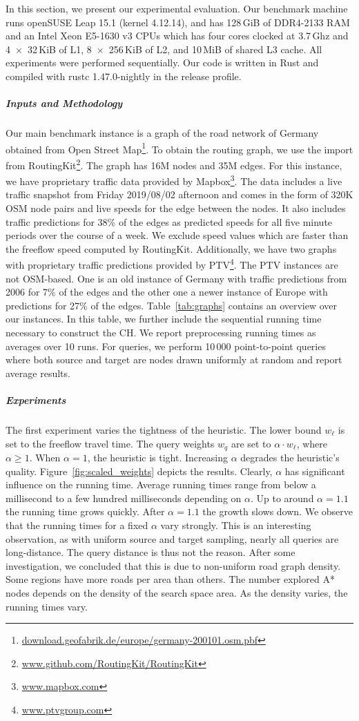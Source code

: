 \documentclass[a4paper,USenglish,cleveref, autoref, thm-restate]{lipics-v2019}
\begin{document}
In this section, we present our experimental evaluation.
Our benchmark machine runs openSUSE Leap 15.1 (kernel 4.12.14), and has 128\,GiB of DDR4-2133 RAM and an Intel Xeon E5-1630 v3 CPUs which has four cores clocked at 3.7\,Ghz and 4~$\times$~32\,KiB of L1, 8~$\times$~256\,KiB of L2, and 10\,MiB of shared L3 cache.
All experiments were performed sequentially.
Our code is written in Rust and compiled with rustc 1.47.0-nightly in the release profile. %

\subparagraph{Inputs and Methodology}
Our main benchmark instance is a graph of the road network of Germany obtained from Open Street Map\footnote{\url{download.geofabrik.de/europe/germany-200101.osm.pbf}}.
To obtain the routing graph, we use the import from RoutingKit\footnote{\url{www.github.com/RoutingKit/RoutingKit}}.
The graph has 16M nodes and 35M edges.
For this instance, we have proprietary traffic data provided by Mapbox\footnote{\url{www.mapbox.com}}.
The  data includes a live traffic snapshot from Friday 2019/08/02 afternoon and comes in the form of 320K OSM node pairs and live speeds for the edge between the nodes.
It also includes traffic predictions for 38\% of the edges as predicted speeds for all five minute periods over the course of a week.
We exclude speed values which are faster than the freeflow speed computed by RoutingKit.
Additionally, we have two graphs with proprietary traffic predictions provided by PTV\footnote{\url{www.ptvgroup.com}}.
The PTV instances are not OSM-based.
One is an old instance of Germany with traffic predictions from 2006 for 7\% of the edges and the other one a newer instance of Europe with predictions for 27\% of the edges.
Table~\ref{tab:graphs} contains an overview over our instances.
In this table, we further include the sequential running time necessary to construct the CH.
We report preprocessing running times as averages over 10 runs.
For queries, we perform 10\,000 point-to-point queries where both source and target are nodes drawn uniformly at random and report average results.

\subparagraph{Experiments}
The first experiment varies the tightness of the heuristic.
The lower bound $w_\ell$ is set to the freeflow travel time.
The query weights $w_q$ are set to $\alpha \cdot w_\ell$, where $\alpha\ge 1$.
When $\alpha = 1$, the heuristic is tight.
Increasing $\alpha$ degrades the heuristic's quality.
Figure~\ref{fig:scaled_weights} depicts the results.
Clearly, $\alpha$ has significant influence on the running time.
Average running times range from below a millisecond to a few hundred milliseconds depending on $\alpha$.
Up to around $\alpha = 1.1$ the running time grows quickly.
After $\alpha = 1.1$ the growth slows down.
We observe that the running times for a fixed $\alpha$ vary strongly.
This is an interesting observation, as with uniform source and target sampling, nearly all queries are long-distance.
The query distance is thus not the reason.
After some investigation, we concluded that this is due to non-uniform road graph density.
Some regions have more roads per area than others.
The number explored A* nodes depends on the density of the search space area.
As the density varies, the running times vary.
\end{document}
